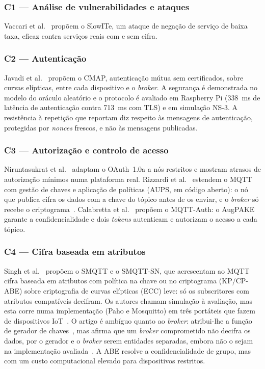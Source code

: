 \subsubsection{C1 --- Análise de vulnerabilidades e ataques}

Vaccari et
al.~\cite{vaccari2020slowite} propõem o SlowITe, um ataque de negação de serviço de
baixa taxa, eficaz contra serviços reais com e sem cifra.

\subsubsection{C2 --- Autenticação}

Javadi et al.~\cite{javadi2026cmap} propõem o CMAP, autenticação mútua sem
certificados, sobre curvas elípticas, entre cada dispositivo e o \emph{broker}. A
segurança é demonstrada no modelo do oráculo aleatório e o protocolo é avaliado em
Raspberry Pi (338~ms de latência de autenticação contra 713~ms com TLS) e em
simulação NS-3. A resistência à repetição que reportam diz respeito às mensagens de
autenticação, protegidas por \emph{nonces} frescos, e não às mensagens publicadas.

\subsubsection{C3 --- Autorização e controlo de acesso}

Niruntasukrat et al.~\cite{niruntasukrat2016authorization} adaptam o OAuth~1.0a a
nós restritos e mostram atrasos de autorização mínimos numa plataforma real.
Rizzardi et al.~\cite{rizzardi2016aups} estendem o MQTT com gestão de chaves e
aplicação de políticas (AUPS, em código aberto): o nó que publica cifra os dados
com a chave do tópico antes de os enviar, e o \emph{broker} só recebe o
criptograma~\cite[§IV, passos 5--7]{rizzardi2016aups}. Calabretta et
al.~\cite{calabretta2018mqttauth} propõem o MQTT-Auth: o AugPAKE garante a
confidencialidade e dois \emph{tokens} autenticam e autorizam o acesso a cada
tópico.

\subsubsection{C4 --- Cifra baseada em atributos}

Singh et al.~\cite{singh2015secure} propõem o SMQTT e o SMQTT-SN, que acrescentam
ao MQTT cifra baseada em atributos com política na chave ou no criptograma
(KP/CP-ABE) sobre criptografia de curvas elípticas (ECC) leve: só os subscritores
com atributos compatíveis decifram. Os autores chamam simulação à avaliação, mas
esta corre numa implementação (Paho e Mosquitto) em três portáteis que fazem de
dispositivos IoT~\cite[§VII-A]{singh2015secure}. O artigo é ambíguo quanto ao
\emph{broker}: atribui-lhe a função de gerador de chaves~\cite[§III-B]{singh2015secure},
mas afirma que um \emph{broker} comprometido não decifra os dados, por o gerador e
o \emph{broker} serem entidades separadas, embora não o sejam na implementação
avaliada~\cite[§VI, §VII-A]{singh2015secure}. A ABE resolve a confidencialidade de grupo, mas com
um custo computacional elevado para dispositivos restritos.

